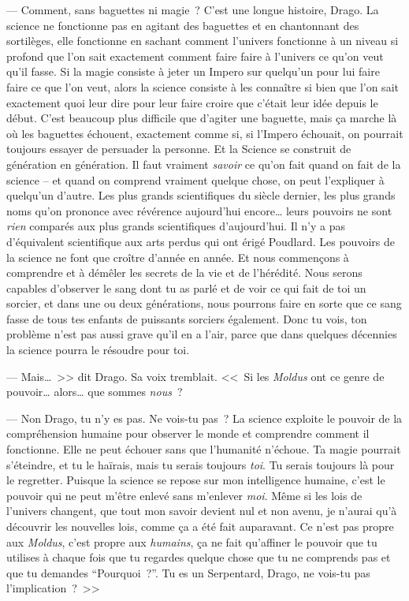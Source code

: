 --- Comment, sans baguettes ni magie~? C'est une longue histoire, Drago. La science ne fonctionne pas en agitant des baguettes et en chantonnant des sortilèges, elle fonctionne en sachant comment l'univers fonctionne à un niveau si profond que l'on sait exactement comment faire faire à l'univers ce qu'on veut qu'il fasse. Si la magie consiste à jeter un Impero sur quelqu'un pour lui faire faire ce que l'on veut, alors la science consiste à les connaître si bien que l'on sait exactement quoi leur dire pour leur faire croire que c'était leur idée depuis le début. C'est beaucoup plus difficile que d'agiter une baguette, mais ça marche là où les baguettes échouent, exactement comme si, si l'Impero échouait, on pourrait toujours essayer de persuader la personne. Et la Science se construit de génération en génération. Il faut vraiment \emph{savoir} ce qu'on fait quand on fait de la science -- et quand on comprend vraiment quelque chose, on peut l'expliquer à quelqu'un d'autre. Les plus grands scientifiques du siècle dernier, les plus grands noms qu'on prononce avec révérence aujourd'hui encore… leurs pouvoirs ne sont \emph{rien} comparés aux plus grands scientifiques d'aujourd'hui. Il n'y a pas d'équivalent scientifique aux arts perdus qui ont érigé Poudlard. Les pouvoirs de la science ne font que croître d'année en année. Et nous commençons à comprendre et à démêler les secrets de la vie et de l'hérédité. Nous serons capables d'observer le sang dont tu as parlé et de voir ce qui fait de toi un sorcier, et dans une ou deux générations, nous pourrons faire en sorte que ce sang fasse de tous tes enfants de puissants sorciers également. Donc tu vois, ton problème n'est pas aussi grave qu'il en a l'air, parce que dans quelques décennies la science pourra le résoudre pour toi.

--- Mais…~>> dit Drago. Sa voix tremblait. <<~Si les \emph{Moldus} ont ce genre de pouvoir… alors… que sommes \emph{nous}~?

--- Non Drago, tu n'y es pas. Ne vois-tu pas~? La science exploite le pouvoir de la compréhension humaine pour observer le monde et comprendre comment il fonctionne. Elle ne peut échouer sans que l'humanité n'échoue. Ta magie pourrait s'éteindre, et tu le haïrais, mais tu serais toujours \emph{toi}. Tu serais toujours là pour le regretter. Puisque la science se repose sur mon intelligence humaine, c'est le pouvoir qui ne peut m'être enlevé sans m'enlever \emph{moi}. Même si les lois de l'univers changent, que tout mon savoir devient nul et non avenu, je n'aurai qu'à découvrir les nouvelles lois, comme ça a été fait auparavant. Ce n'est pas propre aux \emph{Moldus}, c'est propre aux \emph{humains}, ça ne fait qu'affiner le pouvoir que tu utilises à chaque fois que tu regardes quelque chose que tu ne comprends pas et que tu demandes “Pourquoi~?”. Tu es un Serpentard, Drago, ne vois-tu pas l'implication~?~>>


